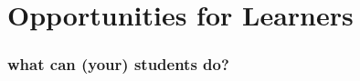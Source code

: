 \section{Opportunities for Learners}
\begin{comment}
* What can your students do?
** One example (pick one - Fedora & your first-year class)
** Documentation
** Translation
** Gardening
** Bug fixing
** Testing
** Artwork/design
** Marketing/outreach
** Being active and vocal users (use open source in outreach/service projects - for instance, Mo & the Girl Scouts) / advocacy
** Legal/licensing work (very, *very* basic stuff)
** it's the non-programming skills that are usually in most need by these communities, because nobody knows about them / how to do them, so you can almost become domain "experts" in a project
** Creative repurposing - bringing a project into a new domain it wasn't necessarily originally designed for
\end{comment}

\begin{frame} 
\frametitle{what can (your) students do?}
\end{frame} 
